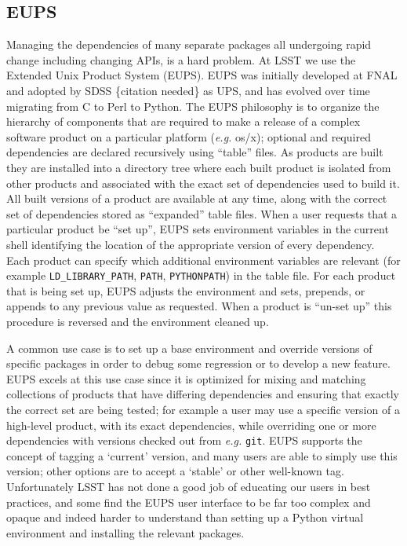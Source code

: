 \subsection{EUPS}\label{sec:eups}

Managing the dependencies of many separate packages all undergoing rapid change including changing APIs, is a hard problem.
At LSST we use the Extended Unix Product System (EUPS)\cite{EUPS}.
EUPS was initially developed at FNAL and adopted by SDSS \{citation needed\} as UPS, and has evolved over time migrating from C to Perl to Python.
The EUPS philosophy is to organize the hierarchy of components that are required to make a release of a complex software product on a particular platform (\textit{e.g.} os/x); optional and required dependencies are declared recursively using ``table'' files. 
As products are built they are installed into a directory tree where each built product is isolated from other products and associated with the exact set of dependencies used to build it.
All built versions of a product are available at any time, along with the correct set of dependencies stored as ``expanded'' table files.
When a user requests that a particular product be ``set up'', EUPS sets environment variables in the current shell identifying the location of the appropriate version of every dependency.
Each product can specify which additional environment variables are relevant (for example \texttt{LD\_LIBRARY\_PATH}, \texttt{PATH}, \texttt{PYTHONPATH}) in the table file.
For each product that is being set up, EUPS adjusts the environment and sets, prepends, or appends to any previous value as requested.
When a product is ``un-set up'' this procedure is reversed and the environment cleaned up.

A common use case is to set up a base environment and override versions of specific packages in order to debug some regression or to develop a new feature.
EUPS excels at this use case since it is optimized for mixing and matching collections of products that have differing dependencies and ensuring that exactly the correct set are being tested; for example a user may use a specific version of a high-level product, with its exact dependencies, while overriding one or more dependencies with versions checked out from \textit{e.g.} \texttt{git}.
EUPS supports the concept of tagging a `current' version, and many users are able to simply use this version; other options are to accept a `stable' or other well-known tag.
Unfortunately LSST has not done a good job of educating our users in best practices, and some find the EUPS user interface to be far too complex and opaque and indeed harder to understand than setting up a Python virtual environment and installing the relevant packages.

